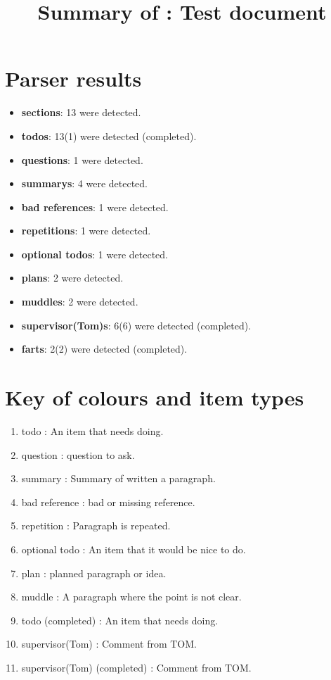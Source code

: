 \title{Summary of : Test document}
\maketitle

\section{Parser results}
    \begin{itemize}[noitemsep]
\item \textbf{sections}: 13 were detected.
\item \textbf{todos}: 13(1) were detected (completed).
\item \textbf{questions}: 1 were detected.
\item \textbf{summarys}: 4 were detected.
\item \textbf{bad references}: 1 were detected.
\item \textbf{repetitions}: 1 were detected.
\item \textbf{optional todos}: 1 were detected.
\item \textbf{plans}: 2 were detected.
\item \textbf{muddles}: 2 were detected.
\item \textbf{supervisor(Tom)s}: 6(6) were detected (completed).
\item \textbf{farts}: 2(2) were detected (completed).
    \end{itemize}

\section{Key of colours and item types}
    \begin{enumerate}[noitemsep]
        \item {\color{red}todo : An item that needs doing.}
        \item {\color{ForestGreen}question : question to ask.}
        \item summary : Summary of written a paragraph.
        \item {\color{Periwinkle}bad reference : bad or missing reference.}
        \item {\color{DarkOrchid}repetition : Paragraph is repeated.}
        \item {\color{Orange}optional todo : An item that it would be nice to do.}
        \item {\color{blue}plan : planned paragraph or idea.}
        \item {\color{OliveGreen}muddle : A paragraph where the point is not clear.}
        \item {\color{Gray}todo (completed) : An item that needs doing.}
        \item {\color{WildStrawberry}supervisor(Tom) : Comment from TOM.}
        \item {\color{Gray}supervisor(Tom) (completed) : Comment from TOM.}
    \end{enumerate}

